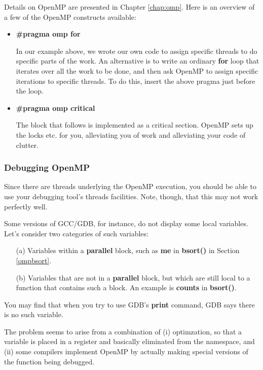 Details on OpenMP are presented in Chapter \ref{chap:omp}.  Here is an
overview of a few of the OpenMP constructs available:

\begin{itemize}

\item \textbf{\#pragma omp for}

In our example above, we wrote our own code to assign specific threads to
do specific parts of the work.  An alternative is to write an ordinary
{\bf for} loop that iterates over all the work to be done, and then ask
OpenMP to assign specific iterations to specific threads.  To do this,
insert the above pragma just before the loop.

\item \textbf{\#pragma omp critical}

The block that follows is implemented as a critical section.  OpenMP
sets up the locks etc. for you, alleviating you of work and alleviating
your code of clutter.

\end{itemize}

\subsubsection{Debugging OpenMP}

Since there are threads underlying the OpenMP execution, you should be
able to use your debugging tool's threads facilities.  Note, though,
that this may not work perfectly well.

Some versions of GCC/GDB, for instance, do not display some local
variables.  Let's consider two categories of such variables:

\begin{itemize}

\item [(a)] Variables within a {\bf parallel} block, such as {\bf me}
in {\bf bsort()} in Section \ref{ompbsort}.

\item [(b)] Variables that are not in a {\bf parallel} block, but which
are still local to a function that contains such a block.  An example is
{\bf counts} in {\bf bsort()}.

\end{itemize}

You may find that when you try to use GDB's {\bf print} command, GDB
says there is no such variable.

The problem seems to arise from a combination of (i) optimzation, so
that a variable is placed in a register and basically eliminated from
the namespace, and (ii) some compilers implement OpenMP by actually
making special versions of the function being debugged.


